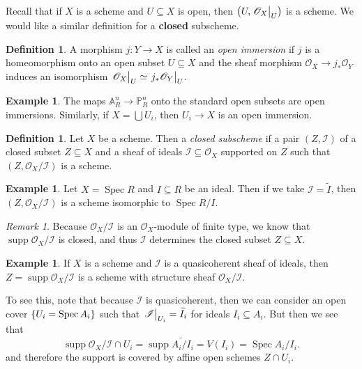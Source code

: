 \documentclass[leqno, openany]{memoir}
\theoremstyle{definition}
\newtheorem{defn}[thm]{Definition}
\newtheorem{exm}[thm]{Example}
\theoremstyle{remark}
\newtheorem{rmk}[thm]{Remark}
\theoremstyle{plain}
\theoremstyle{definition}
\theoremstyle{remark}
\newcommand{\A}{\mathbb{A}}
\renewcommand{\P}{\mathbb{P}}
\newcommand{\msc}[1]{\mathscr{#1}}
\newcommand{\wt}[1]{\widetilde{#1}}
\DeclareMathOperator{\supp}{supp}
\DeclareMathOperator{\Spec}{Spec}
\begin{document}
Recall that if $X$ is a scheme and $U \subseteq X$ is open, then $\qty(U, \eval{\msc{O}_X}_U)$ is a scheme. We would like a similar definition for a \textbf{closed} subscheme.

\begin{defn}
    A morphism $j \colon Y \to X$ is called an \textit{open immersion} if $j$ is a homeomorphism onto an open subset $U \subseteq X$ and the sheaf morphism $\msc{O}_X \to j_* \msc{O}_Y$ induces an isomorphism $\eval{\msc{O}_X}_U \simeq \eval{j_* \msc{O}_Y}_U$.
\end{defn}

\begin{exm}
    The maps $\A^n_R \to \P^n_R$ onto the standard open subsets are open immersions. Similarly, if $X = \bigcup U_i$, then $U_i \to X$ is an open immersion.
\end{exm}

\begin{defn}
    Let $X$ be a scheme. Then a \textit{closed subscheme} if a pair $(Z, \msc{I})$ of a closed subset $Z \subseteq X$ and a sheaf of ideals $\msc{I} \subseteq \msc{O}_X$ supported on $Z$ such that $(Z, \msc{O}_X / \msc{I})$ is a scheme.
\end{defn}

\begin{exm}
    Let $X = \Spec R$ and $I \subseteq R$ be an ideal. Then if we take $\msc{I} = \wt{I}$, then $(Z, \msc{O}_X / \msc{I})$ is a scheme isomorphic to $\Spec R/I$.
\end{exm}

\begin{rmk}
    Because $\msc{O}_X / \msc{I}$ is an $\msc{O}_X$-module of finite type, we know that $\supp \msc{O}_X/\msc{I}$ is closed, and thus $\msc{I}$ determines the closed subset $Z \subseteq X$.
\end{rmk}

\begin{exm}
    If $X$ is a scheme and $\msc{I}$ is a quasicoherent sheaf of ideals, then $Z = \supp \msc{O}_X / \msc{I}$ is a scheme with structure sheaf $\msc{O}_X/\msc{I}$.

    To see this, note that because $\msc{I}$ is quasicoherent, then we can consider an open cover $\qty{U_i = \Spec A_i}$ such that $\eval{\msc{I}}_{U_i} = \wt{I}_i$ for ideals $I_i \subseteq A_i$. But then we see that
    \[ \supp \msc{O}_X/\msc{I} \cap U_i = \supp \wt{A_i/I_i} = V(I_i) = \Spec A_i/I_i. \]
    and therefore the support is covered by affine open schemes $Z \cap U_i$.
\end{exm}
\end{document}
